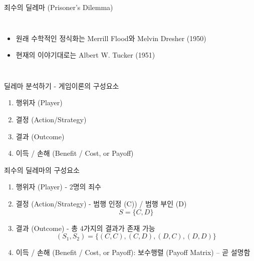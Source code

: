\documentclass[final]{beamer}
\begin{document}
\begin{frame}[t]{죄수의 딜레마 (Prisoner's Dilemma)}
	\begin{columns}[c]
	\column{18em}
	\begin{itemize}
		\item 원래 수학적인 정식화는 Merrill Flood와 Melvin Dresher (1950)
		\item 현재의 이야기대로는 Albert W. Tucker (1951)
	\end{itemize}
	\column{12em}
	\end{columns}
\end{frame}

\begin{frame}[t]{딜레마 분석하기 - 게임이론의 구성요소}
	\begin{enumerate}
		\item 행위자 (Player)
		\item 결정 (Action/Strategy)
		\item 결과 (Outcome)
		\item 이득 / 손해 (Benefit / Cost, or Payoff)
	\end{enumerate}
\end{frame}

\begin{frame}[t]{죄수의 딜레마의 구성요소}
	\begin{enumerate}
		\item 행위자 (Player) - 2명의 죄수
		\item 결정 (Action/Strategy) - 범행 인정 (C)) / 범행 부인 (D)
		\[
			S = \{C,D\}
		\]
		\item 결과 (Outcome) - 총 4가지의 결과가 존재 가능
		\[
			(S_1, S_2) = \{(C,C),(C,D),(D,C),(D,D)\}
		\]
		\item 이득 / 손해 (Benefit / Cost, or Payoff): 보수행렬 (Payoff Matrix) -- 곧 설명함
	\end{enumerate}
\end{frame}
\end{document}
